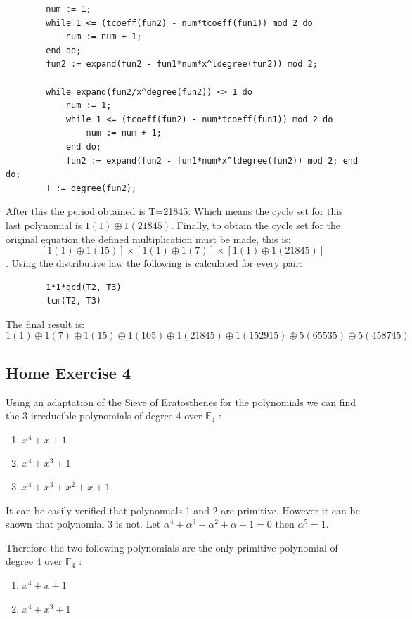 \documentclass{article}
\begin{document}
\begin{enumerate}
\begin{verbatim}
        num := 1;
        while 1 <= (tcoeff(fun2) - num*tcoeff(fun1)) mod 2 do
            num := num + 1;
        end do;
        fun2 := expand(fun2 - fun1*num*x^ldegree(fun2)) mod 2;

        while expand(fun2/x^degree(fun2)) <> 1 do 
            num := 1; 
            while 1 <= (tcoeff(fun2) - num*tcoeff(fun1)) mod 2 do
                num := num + 1; 
            end do; 
            fun2 := expand(fun2 - fun1*num*x^ldegree(fun2)) mod 2; end do;
        T := degree(fun2);
    \end{verbatim}
    After this the period obtained is T=21845. Which means the cycle set for this last polynomial is $1(1) \oplus 1(21845)$.
    Finally, to obtain the cycle set for the original equation the defined multiplication must be made, this is:
    $$[1(1) \oplus 1(15)] \times [1(1) \oplus 1(7)] \times [1(1) \oplus 1(21845)]$$. 
    Using the distributive law the following is calculated for every pair:
    \begin{verbatim}
        1*1*gcd(T2, T3)
        lcm(T2, T3)
    \end{verbatim}
    The final result is:
    $$1(1) \oplus 1(7) \oplus 1(15) \oplus 1(105) \oplus 1(21845) \oplus 1(152915) \oplus 5(65535) \oplus 5(458745)$$
    
\end{enumerate}

\subsection{Home Exercise 4}

Using an adaptation of the Sieve of Eratosthenes for the polynomials we can find the 3 irreducible polynomials of degree 4 over $\mathbb{F}_4$ :
\begin{enumerate}
    \item $x^4+x+1$
    \item $x^4+x^3+1$
    \item $x^4+x^3+x^2+x+1$
\end{enumerate}

It can be easily verified that polynomials 1 and 2 are primitive. However it can be shown that polynomial 3 is not. Let $\alpha^4+\alpha^3+\alpha^2+\alpha+1 = 0$ then $\alpha^5=1$. \newline

Therefore the two following polynomials are the only primitive polynomial of degree 4 over $\mathbb{F}_4$ :
\begin{enumerate}
    \item $x^4+x+1$
    \item $x^4+x^3+1$
\end{enumerate}
\end{document}
